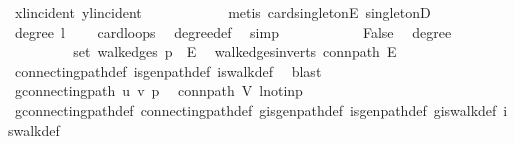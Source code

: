 \begin{isabellebody}
\ xl{\isacharunderscore}{\kern0pt}incident\ yl{\isacharunderscore}{\kern0pt}incident\isanewline
\ \ \ \ \ \ \ \ \ \ \isamarkupfalse%
\ {\isacharparenleft}{\kern0pt}metis\ card{\isacharunderscore}{\kern0pt}{}{\isacharunderscore}{\kern0pt}singletonE\ singletonD{\isacharparenright}{\kern0pt}\isanewline
\ \ \ \ \ \ \ \ \isamarkupfalse%
\ \isamarkupfalse%
\ {\isachardoublequoteopen}degree\ l\ {\isasymnoteq}\ {}{\isachardoublequoteclose}\ \isamarkupfalse%
\ card{\isacharunderscore}{\kern0pt}loops\ \isamarkupfalse%
\ degree{\isacharunderscore}{\kern0pt}def\ \isamarkupfalse%
\ simp\isanewline
\ \ \ \ \ \ \ \ \isamarkupfalse%
\ \isamarkupfalse%
\ False\ \isamarkupfalse%
\ degree\ \isacommand{{\isachardot}{\kern0pt}{\isachardot}{\kern0pt}}\isamarkupfalse%
\isanewline
\ \ \ \ \ \ \isamarkupfalse%
\isanewline
\ \ \ \ \ \ \isamarkupfalse%
\ \isamarkupfalse%
\ {\isachardoublequoteopen}set\ {\isacharparenleft}{\kern0pt}walk{\isacharunderscore}{\kern0pt}edges\ p{\isacharparenright}{\kern0pt}\ {\isasymsubseteq}\ E{\isacharprime}{\kern0pt}{\isachardoublequoteclose}\ \isamarkupfalse%
\ walk{\isacharunderscore}{\kern0pt}edges{\isacharunderscore}{\kern0pt}in{\isacharunderscore}{\kern0pt}verts\ conn{\isacharunderscore}{\kern0pt}path\ E{\isacharprime}{\kern0pt}\ \isamarkupfalse%
\ connecting{\isacharunderscore}{\kern0pt}path{\isacharunderscore}{\kern0pt}def\ is{\isacharunderscore}{\kern0pt}gen{\isacharunderscore}{\kern0pt}path{\isacharunderscore}{\kern0pt}def\ is{\isacharunderscore}{\kern0pt}walk{\isacharunderscore}{\kern0pt}def\ \isamarkupfalse%
\ blast\isanewline
\ \ \ \ \ \ \isamarkupfalse%
\ \isamarkupfalse%
\ {\isachardoublequoteopen}g{\isacharprime}{\kern0pt}{\isachardot}{\kern0pt}connecting{\isacharunderscore}{\kern0pt}path\ u\ v\ p{\isachardoublequoteclose}\ \isamarkupfalse%
\ conn{\isacharunderscore}{\kern0pt}path\ V{\isacharprime}{\kern0pt}\ l{\isacharunderscore}{\kern0pt}notin{\isacharunderscore}{\kern0pt}p\isanewline
\ \ \ \ \ \ \ \ \isamarkupfalse%
\ g{\isacharprime}{\kern0pt}{\isachardot}{\kern0pt}connecting{\isacharunderscore}{\kern0pt}path{\isacharunderscore}{\kern0pt}def\ connecting{\isacharunderscore}{\kern0pt}path{\isacharunderscore}{\kern0pt}def\ g{\isacharprime}{\kern0pt}{\isachardot}{\kern0pt}is{\isacharunderscore}{\kern0pt}gen{\isacharunderscore}{\kern0pt}path{\isacharunderscore}{\kern0pt}def\ is{\isacharunderscore}{\kern0pt}gen{\isacharunderscore}{\kern0pt}path{\isacharunderscore}{\kern0pt}def\ g{\isacharprime}{\kern0pt}{\isachardot}{\kern0pt}is{\isacharunderscore}{\kern0pt}walk{\isacharunderscore}{\kern0pt}def\ is{\isacharunderscore}{\kern0pt}walk{\isacharunderscore}{\kern0pt}def\ \isamarkupfalse%

\end{isabellebody}
